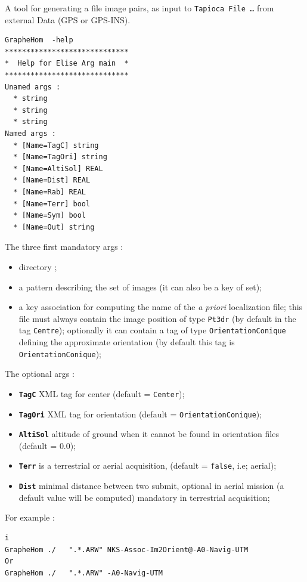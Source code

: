 A tool for generating a file image pairs, as input to {\tt Tapioca File \dots } from external Data (GPS or GPS-INS).

\begin{verbatim}
GrapheHom  -help
*****************************
*  Help for Elise Arg main  *
*****************************
Unamed args :
  * string
  * string
  * string
Named args :
  * [Name=TagC] string
  * [Name=TagOri] string
  * [Name=AltiSol] REAL
  * [Name=Dist] REAL
  * [Name=Rab] REAL
  * [Name=Terr] bool
  * [Name=Sym] bool
  * [Name=Out] string

\end{verbatim}

The three first mandatory args :

\begin{itemize}
   \item directory ;

   \item a pattern describing the set of images (it can also be a key of set);

   \item a key association for computing the name of the \emph{a priori }localization file;
	 this file must always contain the image position of type {\tt Pt3dr}
	 (by default in the tag {\tt Centre});
	 optionally it can contain a tag of type {\tt OrientationConique}  defining
	 the approximate orientation (by default this tag is  {\tt OrientationConique});
\end{itemize}


The optional args :

\begin{itemize}
    \item {\tt \bf TagC} XML tag for center (default = {\tt Center});
    \item {\tt \bf TagOri} XML tag for orientation (default = {\tt OrientationConique});
    \item {\tt \bf AltiSol}  altitude of ground when it cannot be found in orientation files
	   (default = $0.0$);
    \item {\tt \bf Terr}   is a terrestrial or aerial acquisition, (default = {\tt false}, i.e; aerial);
    \item {\tt \bf Dist}  minimal distance between two submit, optional in aerial mission
	  (a default value will be computed) mandatory in terrestrial acquisition;
\end{itemize}


For example :

\begin{verbatim}i
GrapheHom ./   ".*.ARW" NKS-Assoc-Im2Orient@-A0-Navig-UTM
Or
GrapheHom ./   ".*.ARW" -A0-Navig-UTM
\end{verbatim}




